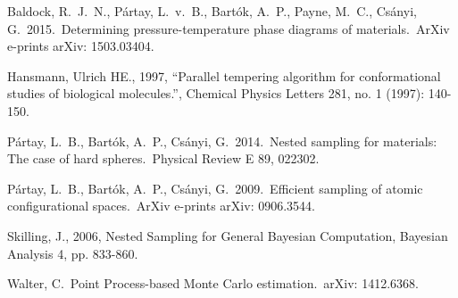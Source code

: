 \documentclass[journal,article,accept,moreauthors,pdftex,12pt,a4paper]{mdpi}
\begin{document}

\makeatletter
\renewcommand\@biblabel[1]{#1. }
\makeatother

\begin{thebibliography}{999} %

 Baldock, R.~J.~N., 
P{\'a}rtay, L.~v.~B., Bart{\'o}k, A.~P., Payne, M.~C., Cs{\'a}nyi, G.\ 
2015.\ Determining pressure-temperature phase diagrams of materials.\ ArXiv 
e-prints arXiv: 1503.03404. 

 Hansmann, Ulrich HE., 1997, ``Parallel tempering algorithm for conformational studies of biological molecules.'', Chemical Physics Letters 281, no. 1 (1997): 140-150.

 P{\'a}rtay, L.~B., 
Bart{\'o}k, A.~P., Cs{\'a}nyi, G.\ 2014.\ Nested sampling for materials: 
The case of hard spheres.\ Physical Review E 89, 022302. 

 P{\'a}rtay, L.~B., 
Bart{\'o}k, A.~P., Cs{\'a}nyi, G.\ 2009.\ Efficient sampling of atomic 
configurational spaces.\ ArXiv e-prints arXiv: 0906.3544. 

 Skilling, J., 2006, Nested Sampling for General Bayesian Computation, Bayesian Analysis 4, pp. 833-860.

Walter, C.\ Point Process-based Monte Carlo estimation.\ arXiv: 1412.6368.


\end{thebibliography}

%
%


%


%
\end{document}
